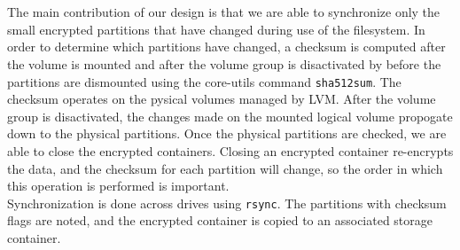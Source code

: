 \documentclass[12pt]{article}
\begin{document}
~\\~\\
The main contribution of our design is that we are able to synchronize only the small encrypted partitions that have changed during use of the filesystem. In order to determine which partitions have changed, a checksum is computed after the volume is mounted and after the volume group is disactivated by before the partitions are dismounted using the core-utils command \verb|sha512sum|. The checksum operates on the pysical volumes managed by LVM. After the volume group is disactivated, the changes made on the mounted logical volume propogate down to the physical partitions. Once the physical partitions are checked, we are able to close the encrypted containers. Closing an encrypted container re-encrypts the data, and the checksum for each partition will change, so the order in which this operation is performed is important.
~\\
Synchronization is done across drives using \verb|rsync|. The partitions with checksum flags are noted, and the encrypted container is copied to an associated storage container.
\end{document}
